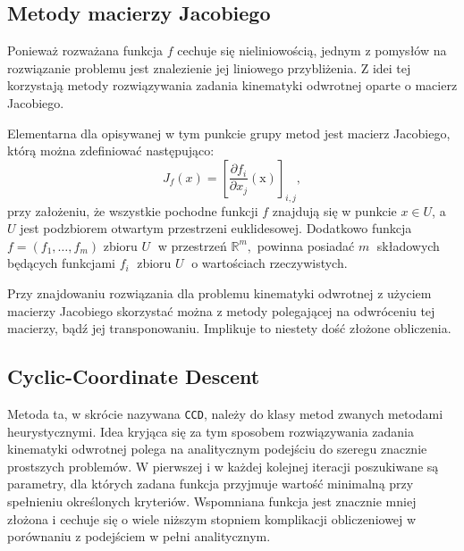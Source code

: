 \documentclass[11pt]{mwrep}
\begin{document}
    \subsection{Metody macierzy Jacobiego}

Ponieważ rozważana funkcja $f$ cechuje się nieliniowością, jednym z pomysłów na rozwiązanie problemu jest znalezienie jej liniowego przybliżenia. Z idei tej korzystają metody rozwiązywania zadania kinematyki odwrotnej oparte o macierz Jacobiego.

Elementarna dla opisywanej w tym punkcie grupy metod jest macierz Jacobiego, którą można zdefiniować następująco:
$$J_f(x) = \left[\frac{\partial f_i}{\partial x_j}(\mathrm x)\right]_{i, j} ,$$
przy założeniu, że wszystkie pochodne funkcji $f$  znajdują się w punkcie $x\in U$, a $U$ jest podzbiorem otwartym przestrzeni euklidesowej. Dodatkowo funkcja $ f = (f_1, \dots, f_m)$ zbioru $U\;$ w przestrzeń $ \mathbb{R}^m,$ powinna posiadać $m\;$ składowych będących funkcjami $f_i\;$ zbioru $U\;$ o wartościach rzeczywistych.

Przy znajdowaniu rozwiązania dla problemu kinematyki odwrotnej z użyciem macierzy Jacobiego skorzystać można z metody polegającej na odwróceniu tej macierzy, bądź jej transponowaniu. Implikuje to niestety dość złożone obliczenia.

    \subsection{Cyclic-Coordinate Descent}

  Metoda ta, w skrócie nazywana \texttt{CCD}, należy do klasy metod zwanych metodami heurystycznymi. Idea kryjąca się za tym sposobem rozwiązywania zadania kinematyki odwrotnej polega na analitycznym podejściu do szeregu znacznie prostszych problemów. W pierwszej i w każdej kolejnej iteracji poszukiwane są parametry, dla których zadana funkcja przyjmuje wartość minimalną przy spełnieniu określonych kryteriów. Wspomniana funkcja jest znacznie mniej złożona i cechuje się o wiele niższym stopniem komplikacji obliczeniowej w porównaniu z podejściem w pełni analitycznym.
\end{document}
